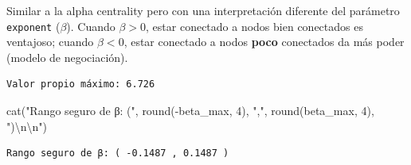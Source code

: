 \documentclass[
  letterpaper,
  DIV=11,
  numbers=noendperiod]{scrreprt}
\newenvironment{Shaded}{\begin{snugshade}}{\end{snugshade}}
\newcommand{\AttributeTok}[1]{\textcolor[rgb]{0.40,0.45,0.13}{#1}}
\newcommand{\CommentTok}[1]{\textcolor[rgb]{0.37,0.37,0.37}{#1}}
\newcommand{\ConstantTok}[1]{\textcolor[rgb]{0.56,0.35,0.01}{#1}}
\newcommand{\DecValTok}[1]{\textcolor[rgb]{0.68,0.00,0.00}{#1}}
\newcommand{\FunctionTok}[1]{\textcolor[rgb]{0.28,0.35,0.67}{#1}}
\newcommand{\NormalTok}[1]{\textcolor[rgb]{0.00,0.23,0.31}{#1}}
\newcommand{\OtherTok}[1]{\textcolor[rgb]{0.00,0.23,0.31}{#1}}
\newcommand{\SpecialCharTok}[1]{\textcolor[rgb]{0.37,0.37,0.37}{#1}}
\newcommand{\StringTok}[1]{\textcolor[rgb]{0.13,0.47,0.30}{#1}}
\begin{document}
Similar a la alpha centrality pero con una interpretación diferente del
parámetro \texttt{exponent} (\(\beta\)). Cuando \(\beta > 0\), estar
conectado a nodos bien conectados es ventajoso; cuando \(\beta < 0\),
estar conectado a nodos \textbf{poco} conectados da más poder (modelo de
negociación).

\begin{Shaded}
\end{Shaded}

\begin{verbatim}
Valor propio máximo: 6.726 
\end{verbatim}

\begin{Shaded}
\begin{Highlighting}[]
\FunctionTok{cat}\NormalTok{(}\StringTok{"Rango seguro de β: ("}\NormalTok{, }\FunctionTok{round}\NormalTok{(}\SpecialCharTok{{-}}\NormalTok{beta\_max, }\DecValTok{4}\NormalTok{), }\StringTok{","}\NormalTok{, }\FunctionTok{round}\NormalTok{(beta\_max, }\DecValTok{4}\NormalTok{), }\StringTok{")}\SpecialCharTok{\textbackslash{}n\textbackslash{}n}\StringTok{"}\NormalTok{)}
\end{Highlighting}
\end{Shaded}

\begin{verbatim}
Rango seguro de β: ( -0.1487 , 0.1487 )
\end{verbatim}
\end{document}
